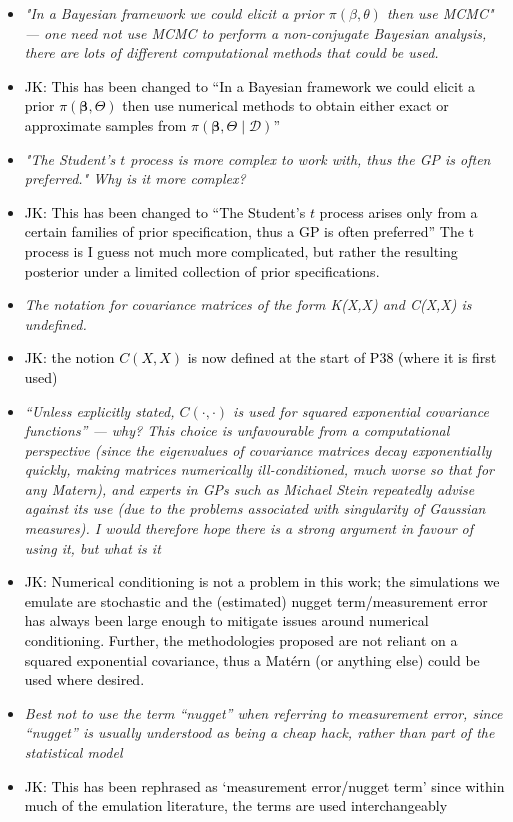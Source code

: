 \documentclass[12pt]{article}
\newcommand{\done}[2]{\item[#1]\textit{#2}}
\newcommand{\jack}[1]{\item{\textcolor{black}{JK: #1}}}
\begin{document}
\begin{itemize}
\done{P38}{"In a Bayesian framework we could elicit a prior $\pi(\beta, \theta)$ then use MCMC" --- one need not use MCMC to perform a non-conjugate Bayesian analysis, there are lots of different computational methods that could be used.}

\jack{This has been changed to ``In a Bayesian framework we could elicit a prior $\pi(\bm{\beta}, \Theta)$ then use numerical methods to obtain either exact or approximate samples from $\pi(\bm{\beta}, \Theta \mid \mathcal{D})$''}

\done{P39}{"The Student’s $t$ process is more complex to work with, thus the GP is often preferred."  Why is it more complex?}

\jack{This has been changed to ``The Student's $t$ process arises only from a certain families of prior specification, thus a GP is often preferred'' The t process is I guess not much more complicated, but rather the resulting posterior under a limited collection of prior specifications.}

\done{P39}{The notation for covariance matrices of the form K(X,X) and C(X,X) is undefined.}

\jack{the notion $C(X, X)$ is now defined at the start of P38 (where it is first used)}

\done{P39}{``Unless explicitly stated, $C(\cdot, \cdot)$ is used for squared exponential covariance functions'' --- why?  This choice is unfavourable from a computational perspective (since the eigenvalues of covariance matrices decay exponentially quickly, making matrices numerically ill-conditioned, much worse so that for any Matern), and experts in GPs such as Michael Stein repeatedly advise against its use (due to the problems associated with singularity of Gaussian measures).  I would therefore hope there is a strong argument in favour of using it, but what is it}

\jack{Numerical conditioning is not a problem in this work; the simulations we emulate are stochastic and the (estimated) nugget term/measurement error has always been large enough to mitigate issues around numerical conditioning.  Further, the methodologies proposed are not reliant on a squared exponential covariance, thus a Mat\'ern (or anything else) could be used where desired.}

\done{P43}{Best not to use the term ``nugget'' when referring to measurement error, since ``nugget'' is usually understood as being a cheap hack, rather than part of the statistical model}

\jack{This has been rephrased as `measurement error/nugget term' since within much of the emulation literature, the terms are used interchangeably}


\end{itemize}
\end{document}
